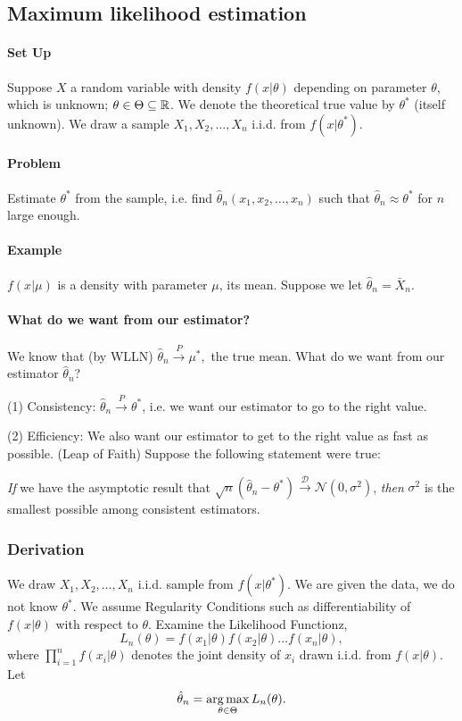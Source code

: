 \documentclass[12pt]{article}  \usepackage{algorithm2e} \usepackage{amsmath} \usepackage{amsthm} \usepackage{amsfonts} \usepackage{bbm} \usepackage{color,soul} \usepackage{framed} \usepackage[margin=0.5in]{geometry} \usepackage{hyperref} \usepackage{mathtools} \usepackage[dvipsnames]{xcolor}
\begin{document}
\subsection{Maximum likelihood estimation}

\paragraph{Set Up} Suppose $X$ a random variable with density $f(x|\theta)$ 
depending on parameter $\theta$, which is unknown; $\theta \in \Theta \subseteq \Bbb R$. We denote the theoretical true value by $\theta^*$ (itself
unknown). We draw a sample $X_1, X_2, \ldots, X_n$ i.i.d. from
$f(x|\theta^*)$.

\paragraph{Problem} Estimate $\theta^*$ from the sample, i.e.
find $\hat \theta_n(x_1, x_2, \ldots, x_n)$ such that $\hat \theta_n \approx \theta^*$ for $n$ large enough.

\paragraph{Example} $f(x|\mu)$ is a density with parameter $\mu$, its mean.
Suppose we let $\hat \theta_n = \bar X_n$. 

\paragraph{What do we want from our estimator?}
We know that (by WLLN) 
$\hat \theta_n \overset{P}{\longrightarrow} \mu^*,$ the true mean. What do we want
from our estimator $\hat \theta_n$?

(1) Consistency: $\hat \theta_n \overset{P}{\longrightarrow} \theta^*$, i.e.
we want our estimator to go to the right value.

(2) Efficiency: We also want our estimator to get to the right value as fast as possible.
(Leap of Faith) Suppose the following statement were true:

\emph{If} we have the asymptotic result that
  $\sqrt n (\hat \theta_n - \theta^*) \overset{ \mathcal D}{\longrightarrow} \mathcal N (0, \sigma^2)$,
\emph{then} $\sigma^2$ is the smallest possible among consistent estimators.

\subsubsection{Derivation}
We draw $X_1, X_2, \ldots, X_n$ i.i.d. sample from $f(x|\theta^*)$.
We are given the data, we do not know $\theta^*$.
We assume Regularity Conditions such as differentiability of 
$f(x|\theta)$ with respect to $\theta$.
Examine the Likelihood Functionz,
\[
L_n(\theta) = f(x_1|\theta) f(x_2|\theta) \ldots f(x_n|\theta),
\]
where $\prod_{i=1}^nf(x_i|\theta)$ denotes the joint density of 
$x_i$ drawn i.i.d. from $f(x|\theta)$. Let 
\[
\hat \theta_n = \operatorname*{arg\,max}_{\theta \in \Theta} L_n(\theta).
\]
\end{document}
